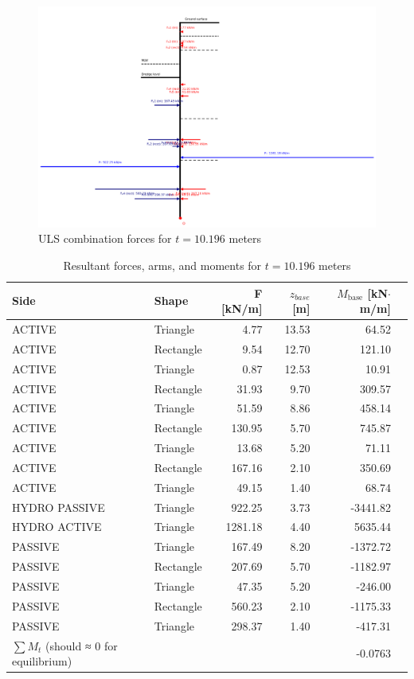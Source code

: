 \begin{figure}[H]
    \centering
    \includegraphics[width=0.80\linewidth]{figures/ch8/uls_combination_scale.png}
    \caption{ULS combination forces for $t = 10.196$ meters}
    \label{fig:appendix_uls_moments_balance_forces}
\end{figure}

\begin{table}[H]
  \centering
  \caption{Resultant forces, arms, and moments for $t = 10.196$ meters}
  \label{tab:appendix_forces_arms_moments_new}
  \small
  \setlength{\tabcolsep}{6pt}
  \renewcommand{\arraystretch}{1.15}
  \begin{tabular}{@{}l l r r r r@{}}
    \toprule
    Side & Shape &
    F [kN/m] & $z_{base}$ [m] &
    $M_{\text{base}}$ [kN$\cdot$m/m] \\
    \midrule
    ACTIVE & Triangle  &   4.77  & 13.53 &   64.52 \\
    ACTIVE & Rectangle &   9.54  & 12.70 &  121.10 \\
    ACTIVE & Triangle  &   0.87  & 12.53 &   10.91 \\
    ACTIVE & Rectangle &  31.93  &  9.70 &  309.57 \\
    ACTIVE & Triangle  &  51.59  &  8.86 &  458.14 \\
    ACTIVE & Rectangle & 130.95  &  5.70 &  745.87 \\
    ACTIVE & Triangle  &  13.68  &  5.20 &   71.11 \\
    ACTIVE & Rectangle & 167.16  &  2.10 &  350.69 \\
    ACTIVE & Triangle  &  49.15  &  1.40 &   68.74 \\
    HYDRO PASSIVE & Triangle  & 922.25 &  3.73 & -3441.82 \\
    HYDRO ACTIVE & Triangle  & 1281.18 & 4.40 & 5635.44 \\
    PASSIVE & Triangle  & 167.49  &  8.20 & -1372.72 \\
    PASSIVE & Rectangle & 207.69  &  5.70 & -1182.97 \\
    PASSIVE & Triangle  &  47.35  &  5.20 &  -246.00 \\
    PASSIVE & Rectangle & 560.23  &  2.10 & -1175.33 \\
    PASSIVE & Triangle  & 298.37  &  1.40 &  -417.31 \\
    \midrule
    $\sum M_{t}$ (should ≈ 0 for equilibrium) & & & & -0.0763 \\
    \bottomrule
  \end{tabular}
\end{table}


